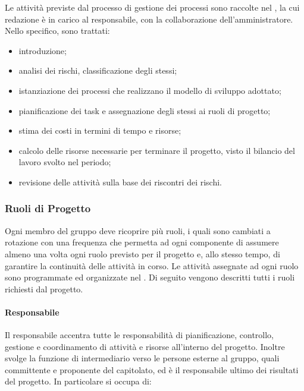 		Le attività previste dal processo di gestione dei processi sono raccolte nel , la cui redazione è in carico al responsabile, con la collaborazione dell'amministratore.
		\newline
		Nello specifico, sono trattati:
		
		\begin{itemize}
			\item introduzione;
			\item analisi dei rischi, classificazione degli stessi;
			\item istanziazione dei processi che realizzano il modello di sviluppo adottato;
			\item pianificazione dei task e assegnazione degli stessi ai ruoli di progetto;
			\item stima dei costi in termini di tempo e risorse;
			\item calcolo delle risorse necessarie per terminare il progetto, visto il bilancio del lavoro svolto nel periodo;
			\item revisione delle attività sulla base dei riscontri dei rischi.
		\end{itemize}
	
	\subsubsection{Ruoli di Progetto}
	
		Ogni membro del gruppo deve ricoprire più ruoli, i quali sono cambiati a rotazione con una frequenza che permetta ad ogni componente di assumere almeno una volta ogni ruolo previsto per il progetto e, allo stesso tempo, di garantire la continuità delle attività in corso.
		\newline
		Le attività assegnate ad ogni ruolo sono programmate ed organizzate nel .
		\newline
		Di seguito vengono descritti tutti i ruoli richiesti dal progetto.
	
		\paragraph{Responsabile}
		
			Il responsabile accentra tutte le responsabilità di pianificazione, controllo, gestione e coordinamento di attività e risorse all'interno del progetto. Inoltre svolge la funzione di intermediario verso le persone esterne al gruppo, quali committente e proponente del capitolato, ed è il responsabile ultimo dei risultati del progetto.
			\newline
			In particolare si occupa di:
			
